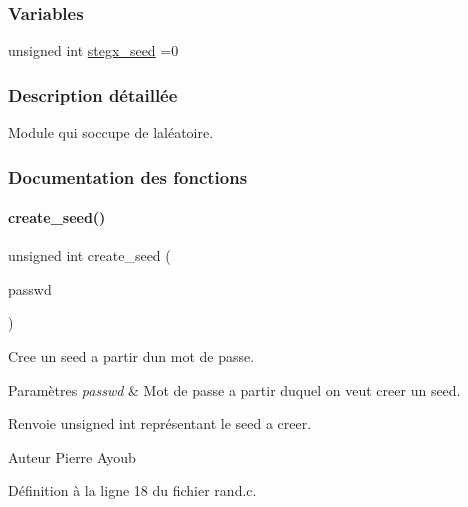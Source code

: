 \subsubsection*{Variables}
\begin{DoxyCompactItemize}
\item 
unsigned int \hyperlink{a00122_aade668af3b80df20c9f47101fea60399}{stegx\+\_\+seed} =0
\end{DoxyCompactItemize}


\subsubsection{Description détaillée}
Module qui s\textquotesingle{}occupe de l\textquotesingle{}aléatoire. 



\subsubsection{Documentation des fonctions}
\mbox{\label{a00122_a2a891bbe3514201de3cfc5acced104b7}} 
\paragraph{\texorpdfstring{create\+\_\+seed()}{create\_seed()}}
{\footnotesize\ttfamily unsigned int create\+\_\+seed (\begin{DoxyParamCaption}\item[{const char $\ast$}]{passwd }\end{DoxyParamCaption})}



Cree un seed a partir d\textquotesingle{}un mot de passe. 


\begin{DoxyParams}{Paramètres}
{\em passwd} & Mot de passe a partir duquel on veut creer un seed. \\
\hline
\end{DoxyParams}
\begin{DoxyReturn}{Renvoie}
unsigned int représentant le seed a creer. 
\end{DoxyReturn}
\begin{DoxyAuthor}{Auteur}
Pierre Ayoub 
\end{DoxyAuthor}


Définition à la ligne 18 du fichier rand.\+c.

